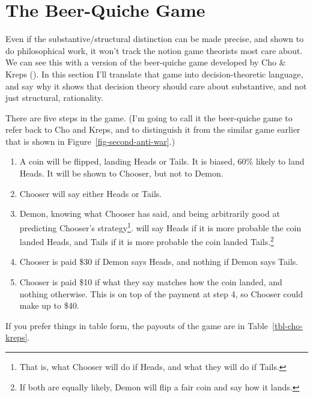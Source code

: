 \documentclass[
  12pt,
  letterpaper,
  DIV=11,
  numbers=noendperiod]{scrreprt}
\providecommand{\tightlist}{%
  \setlength{\itemsep}{0pt}\setlength{\parskip}{0pt}}\usepackage{longtable,booktabs,array}
\begin{document}
\section{The Beer-Quiche Game}\label{sec-beer-quiche}

Even if the substantive/structural distinction can be made precise, and
shown to do philosophical work, it won't track the notion game theorists
most care about. We can see this with a version of the beer-quiche game
developed by Cho \& Kreps (). In this
section I'll translate that game into decision-theoretic language, and
say why it shows that decision theory should care about substantive, and
not just structural, rationality.

There are five steps in the game. (I'm going to call it the beer-quiche
game to refer back to Cho and Kreps, and to distinguish it from the
similar game earlier that is shown in Figure~\ref{fig-second-anti-war}.)

\begin{enumerate}
\def\labelenumi{\arabic{enumi}.}
\tightlist
\item
  A coin will be flipped, landing Heads or Tails. It is biased, 60\%
  likely to land Heads. It will be shown to Chooser, but not to Demon.
\item
  Chooser will say either Heads or Tails.
\item
  Demon, knowing what Chooser has said, and being arbitrarily good at
  predicting Chooser's strategy\footnote{That is, what Chooser will do
    if Heads, and what they will do if Tails.}. will say Heads if it is
  more probable the coin landed Heads, and Tails if it is more probable
  the coin landed Tails.\footnote{If both are equally likely, Demon will
    flip a fair coin and say how it lands.}
\item
  Chooser is paid \$30 if Demon says Heads, and nothing if Demon says
  Tails.
\item
  Chooser is paid \$10 if what they say matches how the coin landed, and
  nothing otherwise. This is on top of the payment at step 4, so Chooser
  could make up to \$40.
\end{enumerate}

If you prefer things in table form, the payouts of the game are in
Table~\ref{tbl-cho-kreps}.
\end{document}
